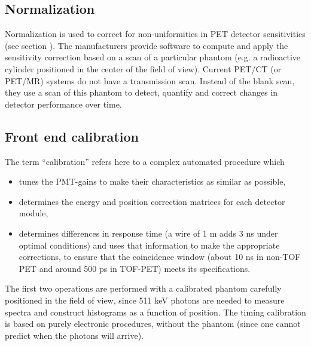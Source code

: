 \subsection{Normalization}
Normalization is used to correct for non-uniformities in PET detector
sensitivities (see section ). The
manufacturers provide software to compute and apply the sensitivity
correction based on a scan of a particular phantom (e.g. a radioactive
cylinder positioned in the center of the field of view). Current
PET/CT (or PET/MR) systems do not have a transmission scan. Instead of
the blank scan, they use a scan of this phantom to detect, quantify
and correct changes in detector performance over time.

\subsection{Front end calibration}
The term ``calibration'' refers here to a complex automated procedure
which
\begin{itemize}
  \item tunes the PMT-gains to make their characteristics as similar as
        possible,
  \item determines the energy and position correction matrices for each
        detector module,
  \item determines differences in response time (a wire of 1 m adds 3
        ns under optimal conditions) and uses that information to make
        the appropriate corrections, to ensure that the coincidence
        window (about 10 ns in non-TOF PET and around 500 ps in
        TOF-PET) meets its specifications.
\end{itemize}
The first two operations are performed with a calibrated phantom carefully
positioned in the field of view, since 511 keV photons are needed to measure
spectra and construct histograms as a function of position. The timing
calibration is based on purely electronic procedures, without the phantom
(since one cannot predict when the photons will arrive).


